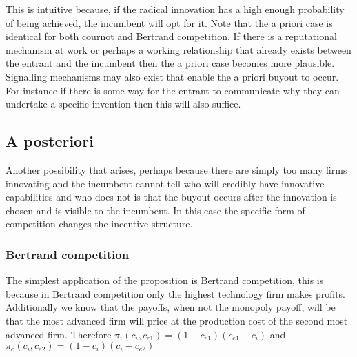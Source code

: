 \documentclass[11pt]{article}
\begin{document}
This is intuitive because, if the radical innovation has a high enough probability of being achieved, the incumbent will opt for it. Note that the a priori case is identical for both cournot and Bertrand competition. If there is a reputational mechanism at work or perhaps a working relationship that already exists between the entrant and the incumbent then the a priori case becomes more plausible. Signalling mechanisms may also exist that enable the a priori buyout to occur. For instance if there is some way for the entrant to communicate why they can undertake a specific invention then this will also suffice.

\subsection{A posteriori}
Another possibility that arises, perhaps because there are simply too many firms innovating and the incumbent cannot tell who will credibly have innovative capabilities and who does not is that the buyout occurs after the innovation is chosen and is visible to the incumbent. In this case the specific form of competition changes the incentive structure. 

\subsubsection*{Bertrand competition}


The simplest application of the proposition is Bertrand competition, this is because in Bertrand competition only the highest technology firm makes profits. Additionally we know that the payoffs, when not the monopoly payoff, will be that the most advanced firm will price at the production cost of the second most advanced firm. Therefore $\pi_i(c_i,c_{e1})= (1-c_{e1})(c_{e1}-c_i)$ and $\pi_e(c_i,c_{e2})= (1-c_{i})(c_{i}-c_{e2})$

 
\end{document}
